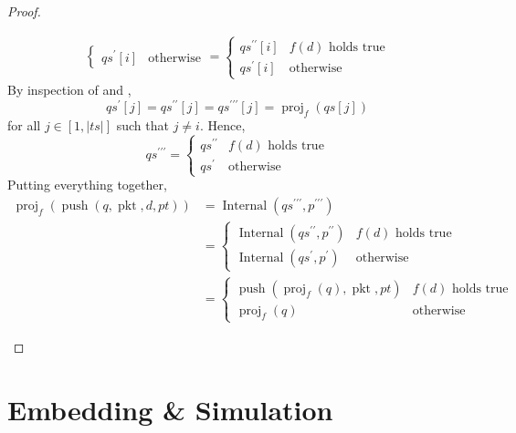 \documentclass{amsart}
\DeclareMathOperator{\pkt}{\mathrm{pkt}}
\DeclareMathOperator{\push}{\mathrm{push}}
\DeclareMathOperator{\proj}{\mathrm{proj}}
\DeclareMathOperator{\Internal}{\mathrm{Internal}}
\theoremstyle{definition}
\begin{document}
\begin{proof}
\begin{itemize}
\begin{align*}
\begin{cases}
                    qs^\prime[i] & \text{otherwise}
                \end{cases}
                                                            =
                \begin{cases}
                    qs^{\prime\prime}[i] & f(d) \text{ holds true}\\
                    qs^\prime[i] & \text{otherwise}
                \end{cases}
            \end{align*}
            By inspection of  and ,
            $$qs^\prime[j] = qs^{\prime\prime}[j] = qs^{\prime\prime\prime}[j] = \proj_f(qs[j])$$
            for all $j \in [1, |ts|]$ such that $j \neq i$.
            Hence,
            $$
            qs^{\prime\prime\prime}
            =
            \begin{cases}
                qs^{\prime\prime} & f(d) \text{ holds true}\\
                qs^{\prime} & \text{otherwise}
            \end{cases}
            $$
            Putting everything together, 
            \begin{align*}
                \proj_f(\push(q, \pkt, d, pt)) &= \Internal(qs^{\prime\prime\prime}, p^{\prime\prime\prime})\\
                                               &=
                \begin{cases}
                    \Internal(qs^{\prime\prime}, p^{\prime\prime}) & f(d) \text{ holds true}\\
                    \Internal(qs^{\prime}, p^{\prime}) & \text{otherwise}
                \end{cases}\\
                                               &=
                \begin{cases}
                    \push(\proj_f(q), \pkt, pt) & f(d) \text{ holds true}\\
                    \proj_f(q) & \text{otherwise}
                \end{cases}
            \end{align*}
    \end{itemize}
\end{proof}


\section{Embedding \& Simulation}
\end{document}
